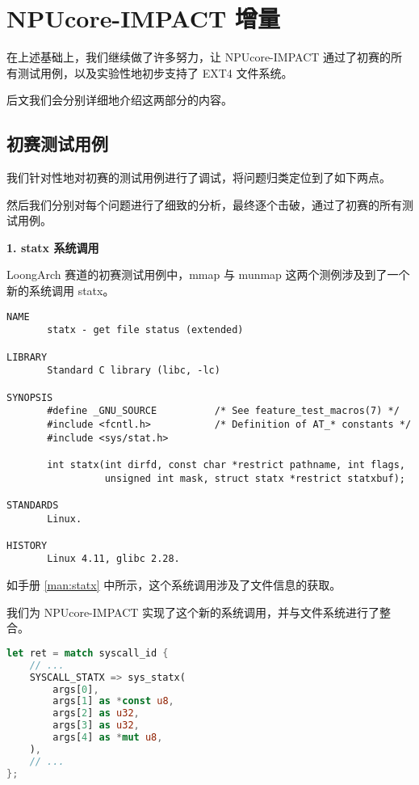 \chapter{NPUcore-IMPACT 增量}

在上述基础上，我们继续做了许多努力，让 NPUcore-IMPACT 通过了初赛的所有测试用例，以及实验性地初步支持了 EXT4 文件系统。

后文我们会分别详细地介绍这两部分的内容。

\section{初赛测试用例}

我们针对性地对初赛的测试用例进行了调试，将问题归类定位到了如下两点。

然后我们分别对每个问题进行了细致的分析，最终逐个击破，通过了初赛的所有测试用例。

\textbf{1. statx 系统调用}

LoongArch 赛道的初赛测试用例中，mmap 与 munmap 这两个测例涉及到了一个新的系统调用 statx。

\begin{lstlisting}[label={man:statx}, caption={statx 手册}]
NAME
       statx - get file status (extended)

LIBRARY
       Standard C library (libc, -lc)

SYNOPSIS
       #define _GNU_SOURCE          /* See feature_test_macros(7) */
       #include <fcntl.h>           /* Definition of AT_* constants */
       #include <sys/stat.h>

       int statx(int dirfd, const char *restrict pathname, int flags,
                 unsigned int mask, struct statx *restrict statxbuf);

STANDARDS
       Linux.

HISTORY
       Linux 4.11, glibc 2.28.
\end{lstlisting}

如手册 \ref{man:statx} 中所示，这个系统调用涉及了文件信息的获取。

我们为 NPUcore-IMPACT 实现了这个新的系统调用，并与文件系统进行了整合。

\begin{lstlisting}[language={Rust}, caption={statx 系统调用入口}]
let ret = match syscall_id {
    // ...
    SYSCALL_STATX => sys_statx(
        args[0],
        args[1] as *const u8,
        args[2] as u32,
        args[3] as u32,
        args[4] as *mut u8,
    ),
    // ...
};
\end{lstlisting}

